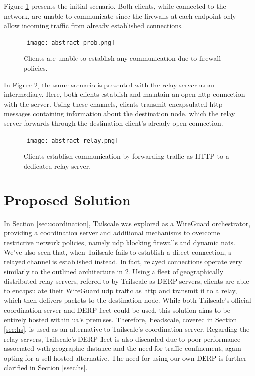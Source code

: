 \documentclass[11pt,twoside,a4paper]{report}
\begin{document}
Figure \ref{fig:absprob} presents the initial scenario. Both clients, while connected to the network, are unable to communicate since the firewalls at each endpoint only allow incoming traffic from already established connections.

\begin{figure}[h]
\centering
\texttt{[image: abstract-prob.png]}
\caption{Clients are unable to establish any communication due to firewall policies.}
\label{fig:absprob}
\end{figure}

In Figure \ref{fig:absrelay}, the same scenario is presented with the relay server as an intermediary. Here, both clients establish and maintain an open \ac{http} connection with the server. Using these channels, clients transmit encapsulated \ac{http} messages containing information about the destination node, which the relay server forwards through the destination client's already open connection.

\begin{figure}[h]
\centering
\texttt{[image: abstract-relay.png]}
\caption{Clients establish communication by forwarding traffic as HTTP to a dedicated relay server.}
\label{fig:absrelay}
\end{figure}

\section{Proposed Solution}

In Section \ref{sec:coordination}, Tailscale was explored as a WireGuard orchestrator, providing a coordination server and additional mechanisms to overcome restrictive network policies, namely \ac{udp} blocking firewalls and dynamic \ac{nat}s. We've also seen that, when Tailscale fails to establish a direct connection, a relayed channel is established instead. In fact, relayed connections operate very similarly to the outlined architecture in \ref{fig:absrelay}. Using a fleet of geographically distributed relay servers, refered to by Tailscale as \ac{DERP} servers, clients are able to encapsulate their WireGuard \ac{udp} traffic as \ac{http} and transmit it to a relay, which then delivers packets to the destination node. While both Tailscale's official coordination server and \ac{DERP} fleet could be used, this solution aims to be entirely hosted within \ac{ua}'s premises. Therefore, Headscale, covered in Section \ref{sec:hs}, is used as an alternative to Tailscale's coordination server. Regarding the relay servers, Tailscale's \ac{DERP} fleet is also discarded due to poor performance associated with geographic distance and the need for traffic confinement, again opting for a self-hosted alternative. The need for using our own \ac{DERP} is further clarified in Section \ref{ssec:hs}.
\end{document}
